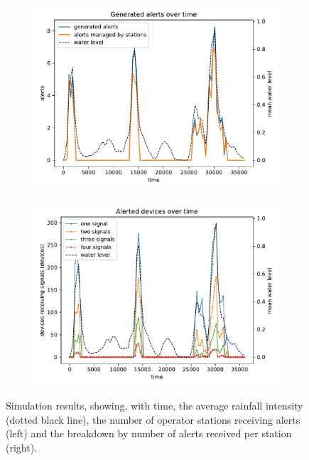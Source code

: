 \begin{figure}[t]
  \begin{subfigure}[b]{0.49\linewidth}
    \centering
    \includegraphics[width=\linewidth]{papers/ieee2022/img/charts/danger-and-managed.pdf}
  \end{subfigure}
  \hfill
  \begin{subfigure}[b]{0.49\linewidth}
    \centering
    \includegraphics[width=\linewidth]{papers/ieee2022/img/charts/danger-evolution.pdf}
  \end{subfigure}
  \caption[\casename{} simulation]{
    Simulation results, showing, with time, the average rainfall intensity (dotted black line),
    the number of operator stations receiving alerts (left)
    and the breakdown by number of alerts received per station (right).
  }
  \label{fig:simulation-charts}
\end{figure}
